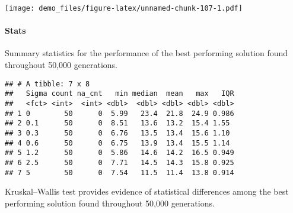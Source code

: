 \documentclass[]{book}
\newenvironment{Shaded}{\begin{snugshade}}{\end{snugshade}}
\newcommand{\DataTypeTok}[1]{\textcolor[rgb]{0.13,0.29,0.53}{#1}}
\newcommand{\KeywordTok}[1]{\textcolor[rgb]{0.13,0.29,0.53}{\textbf{#1}}}
\newcommand{\NormalTok}[1]{#1}
\newcommand{\OperatorTok}[1]{\textcolor[rgb]{0.81,0.36,0.00}{\textbf{#1}}}
\newcommand{\OtherTok}[1]{\textcolor[rgb]{0.56,0.35,0.01}{#1}}
\newcommand{\StringTok}[1]{\textcolor[rgb]{0.31,0.60,0.02}{#1}}
\let\oldparagraph\paragraph
\renewcommand{\paragraph}[1]{\oldparagraph{#1}\mbox{}}
\begin{document}
\texttt{[image: demo\_files/figure-latex/unnamed-chunk-107-1.pdf]}

\hypertarget{stats-58}{%
\paragraph{Stats}\label{stats-58}}

Summary statistics for the performance of the best performing solution found throughout 50,000 generations.

\begin{Shaded}
\end{Shaded}

\begin{verbatim}
## # A tibble: 7 x 8
##   Sigma count na_cnt   min median  mean   max   IQR
##   <fct> <int>  <int> <dbl>  <dbl> <dbl> <dbl> <dbl>
## 1 0        50      0  5.99   23.4  21.8  24.9 0.986
## 2 0.1      50      0  8.51   13.6  13.2  15.4 1.55 
## 3 0.3      50      0  6.76   13.5  13.4  15.6 1.10 
## 4 0.6      50      0  6.75   13.9  13.4  15.5 1.14 
## 5 1.2      50      0  5.86   14.6  14.2  16.5 0.949
## 6 2.5      50      0  7.71   14.5  14.3  15.8 0.925
## 7 5        50      0  7.54   11.5  11.4  13.8 0.914
\end{verbatim}

Kruskal--Wallis test provides evidence of statistical differences among the best performing solution found throughout 50,000 generations.
\end{document}
